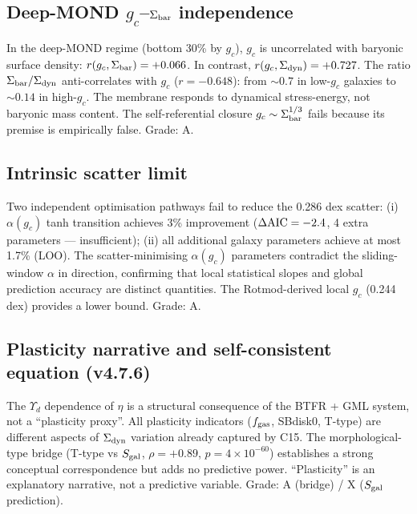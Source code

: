 \documentclass[11pt,a4paper]{article}
\newcommand{\e}[1]{\times 10^{#1}}
\newcommand{\gc}{g_{c}}
\newcommand{\Yd}{\Upsilon_{d}}
\newcommand{\sigdyn}{\Sigma_{\rm dyn}}
\newcommand{\sigbar}{\Sigma_{\rm bar}}
\newcommand{\fgas}{f_{\rm gas}}
\newcommand{\Sgal}{S_{\rm gal}}
\newcommand{\AIC}{\Delta{\rm AIC}}
\begin{document}
\subsection{Deep-MOND $\gc$--$\sigbar$ independence}
In the deep-MOND regime (bottom 30\% by $\gc$), $\gc$ is uncorrelated with baryonic surface density:
$r(\gc, \sigbar) = +0.066$. In contrast, $r(\gc, \sigdyn) = +0.727$. The ratio $\sigbar/\sigdyn$
anti-correlates with $\gc$ ($r = -0.648$): from $\sim 0.7$ in low-$\gc$ galaxies to $\sim 0.14$ in high-$\gc$.
The membrane responds to dynamical stress-energy, not baryonic mass content. The self-referential closure
$\gc \sim \sigbar^{1/3}$ fails because its premise is empirically false. Grade: A.

\subsection{Intrinsic scatter limit}
Two independent optimisation pathways fail to reduce the 0.286 dex scatter: (i) $\alpha(\gc)$ tanh transition
achieves 3\% improvement ($\AIC = -2.4$, 4 extra parameters --- insufficient); (ii) all additional galaxy
parameters achieve at most 1.7\% (LOO). The scatter-minimising $\alpha(\gc)$ parameters contradict the
sliding-window $\alpha$ in direction, confirming that local statistical slopes and global prediction accuracy
are distinct quantities. The Rotmod-derived local $\gc$ (0.244 dex) provides a lower bound. Grade: A.

\subsection{Plasticity narrative and self-consistent equation (v4.7.6)}
The $\Yd$ dependence of $\eta$ is a structural consequence of the BTFR + GML system, not a ``plasticity
proxy''. All plasticity indicators ($\fgas$, SBdisk0, T-type) are different aspects of $\sigdyn$ variation
already captured by C15. The morphological-type bridge (T-type vs $\Sgal$, $\rho = +0.89$,
$p = 4\e{-60}$) establishes a strong conceptual correspondence but adds no predictive power.
``Plasticity'' is an explanatory narrative, not a predictive variable. Grade: A (bridge) / X ($\Sgal$
prediction).
\end{document}
